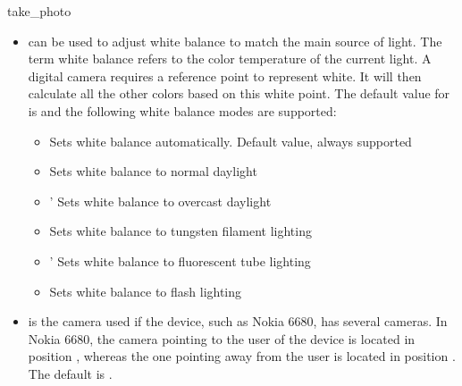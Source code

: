 \begin{funcdesc}{take_photo}{}
\begin{itemize}
\begin{itemize}
Sets exposure automatically. Default value, always supported
	\item {} \newline
Night-time setting for long exposures
	\item {} \newline
Backlight setting for bright backgrounds
	\item {} \newline
Centered mode for ignoring surroundings
	\end{itemize}
\item {} can be used to adjust white balance to match the main source of light. The term white balance refers to the color temperature of the current light. A digital camera requires a reference point to represent white. It will then calculate all the other colors based on this white point. The default value for  is  and the following white balance modes are supported:
	\begin{itemize}
	\item {} \newline
Sets white balance automatically. Default value, always supported
	\item {} \newline
Sets white balance to normal daylight
	\item {}' \newline
Sets white balance to overcast daylight
	\item {} \newline
Sets white balance to tungsten filament lighting
	\item {}' \newline
Sets white balance to fluorescent tube lighting
	\item {} \newline
Sets white balance to flash lighting
	\end{itemize}
\item {} is the camera used if the device, such as Nokia 6680, has several cameras. In Nokia 6680, the camera pointing to the user of the device is located in position , whereas the one pointing away from the user is located in position . The default  is .
\end{itemize}
\end{funcdesc}
